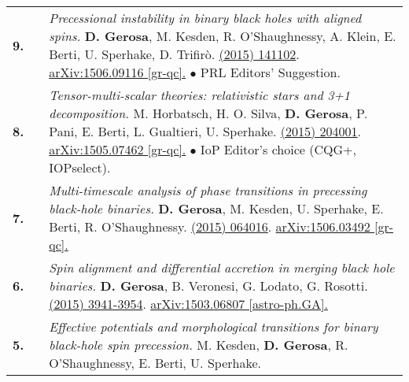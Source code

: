 {\begin{longtable}{rp{0.3cm}p{15.8cm}}
\textbf{9.} & & \textit{Precessional instability in binary black holes with aligned spins.}
\newline{}
\textbf{D. Gerosa}, M. Kesden, R. O'Shaughnessy, A. Klein, E. Berti, U. Sperhake, D. Trifir\`o.
\newline{}
\href{http://dx.doi.org/10.1103/PhysRevLett.115.141102}{\prl 115 (2015) 141102}. \href{https://arxiv.org/abs/1506.09116}{arXiv:1506.09116 [gr-qc].}
\newline{}
\textcolor{color1}{$\bullet$} PRL Editors' Suggestion.
\vspace{0.09cm}\\
%
\textbf{8.} & & \textit{Tensor-multi-scalar theories: relativistic stars and 3+1 decomposition.}
\newline{}
M. Horbatsch, H. O. Silva, \textbf{D. Gerosa}, P. Pani,  E. Berti, L. Gualtieri, U. Sperhake.
\newline{}
\href{http://dx.doi.org/10.1088/0264-9381/32/20/204001}{\cqg 32 (2015) 204001}. \href{https://arxiv.org/abs/1505.07462}{arXiv:1505.07462 [gr-qc].}
\newline{}
\textcolor{color1}{$\bullet$} IoP Editor's choice (CQG+, IOPselect).
\vspace{0.09cm}\\
%
\textbf{7.} & & \textit{Multi-timescale analysis of phase transitions in precessing black-hole binaries.}
\newline{}
\textbf{D. Gerosa}, M. Kesden, U. Sperhake, E. Berti, R. O'Shaughnessy.
\newline{}
\href{http://dx.doi.org/10.1103/PhysRevD.92.064016}{\prd 92 (2015) 064016}. \href{https://arxiv.org/abs/1506.03492}{arXiv:1506.03492 [gr-qc].}
\vspace{0.09cm}\\
%
\textbf{6.} & & \textit{Spin alignment and differential accretion in merging black hole binaries.}
\newline{}
\textbf{D. Gerosa}, B. Veronesi, G. Lodato, G. Rosotti.
\newline{}
\href{http://dx.doi.org/10.1093/mnras/stv1214}{\mnras 451 (2015) 3941-3954}. \href{https://arxiv.org/abs/1503.06807}{arXiv:1503.06807 [astro-ph.GA].}
\vspace{0.09cm}\\
%
\textbf{5.} & & \textit{Effective potentials and morphological transitions for binary black-hole spin precession.}
\newline{}
M. Kesden, \textbf{D. Gerosa}, R. O'Shaughnessy, E. Berti, U. Sperhake.
\newline{}

\end{longtable}}

